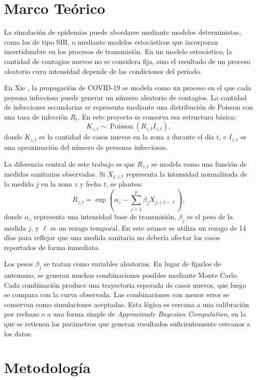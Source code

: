\documentclass[12pt]{article}
\begin{document}
\newpage

\section{Marco Teórico}

La simulación de epidemias puede abordarse mediante modelos deterministas, como
los de tipo SIR, o mediante modelos estocásticos que incorporan incertidumbre en
los procesos de transmisión. En un modelo estocástico, la cantidad de contagios
nuevos no se considera fija, sino el resultado de un proceso aleatorio cuya
intensidad depende de las condiciones del periodo.

En Xie \cite{Xie2020}, la propagación de COVID-19 se modela como un proceso en
el que cada persona infecciosa puede generar un número aleatorio de contagios.
La cantidad de infecciones secundarias se representa mediante una distribución
de Poisson con una tasa de infección \(R_t\). En este proyecto se conserva esa
estructura básica:
\[
  K_{z,t} \sim \operatorname{Poisson}(R_{z,t} I_{z,t}),
\]
donde \(K_{z,t}\) es la cantidad de casos nuevos en la zona \(z\) durante el
día \(t\), e \(I_{z,t}\) es una aproximación del número de personas
infecciosas.

La diferencia central de este trabajo es que \(R_{z,t}\) se modela como una
función de medidas sanitarias observadas. Si \(X_{j,z,t}\) representa la
intensidad normalizada de la medida \(j\) en la zona \(z\) y fecha \(t\), se
plantea:
\[
  R_{z,t} =
  \exp\left(
    \alpha_z - \sum_{j=1}^{p} \beta_j X_{j,z,t-\ell}
  \right),
\]
donde \(\alpha_z\) representa una intensidad base de transmisión, \(\beta_j\)
es el peso de la medida \(j\), y \(\ell\) es un rezago temporal. En este avance
se utiliza un rezago de 14 días para reflejar que una medida sanitaria no
debería afectar los casos reportados de forma inmediata.

Los pesos \(\beta_j\) se tratan como variables aleatorias. En lugar de fijarlos
de antemano, se generan muchas combinaciones posibles mediante Monte Carlo. Cada
combinación produce una trayectoria esperada de casos nuevos, que luego se
compara con la curva observada. Las combinaciones con menor error se conservan
como simulaciones aceptadas. Esta lógica es cercana a una calibración por
rechazo o a una forma simple de \textit{Approximate Bayesian Computation}, en la
que se retienen los parámetros que generan resultados suficientemente cercanos a
los datos.

\newpage

\section{Metodología}
\end{document}
